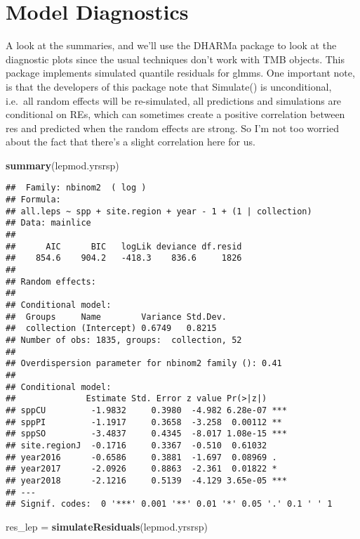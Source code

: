 \documentclass[]{article}
\newenvironment{Shaded}{\begin{snugshade}}{\end{snugshade}}
\newcommand{\KeywordTok}[1]{\textcolor[rgb]{0.13,0.29,0.53}{\textbf{#1}}}
\newcommand{\StringTok}[1]{\textcolor[rgb]{0.31,0.60,0.02}{#1}}
\newcommand{\NormalTok}[1]{#1}
\begin{document}
\section{Model Diagnostics}\label{model-diagnostics}

A look at the summaries, and we'll use the DHARMa package to look at the
diagnostic plots since the usual techniques don't work with TMB objects.
This package implements simulated quantile residuals for glmms. One
important note, is that the developers of this package note that
Simulate() is unconditional, i.e.~all random effects will be
re-simulated, all predictions and simulations are conditional on REs,
which can sometimes create a positive correlation between res and
predicted when the random effects are strong. So I'm not too worried
about the fact that there's a slight correlation here for us.

\begin{Shaded}
\begin{Highlighting}[]
\KeywordTok{summary}\NormalTok{(lepmod.yrsrsp)}
\end{Highlighting}
\end{Shaded}

\begin{verbatim}
##  Family: nbinom2  ( log )
## Formula:          
## all.leps ~ spp + site.region + year - 1 + (1 | collection)
## Data: mainlice
## 
##      AIC      BIC   logLik deviance df.resid 
##    854.6    904.2   -418.3    836.6     1826 
## 
## Random effects:
## 
## Conditional model:
##  Groups     Name        Variance Std.Dev.
##  collection (Intercept) 0.6749   0.8215  
## Number of obs: 1835, groups:  collection, 52
## 
## Overdispersion parameter for nbinom2 family (): 0.41 
## 
## Conditional model:
##              Estimate Std. Error z value Pr(>|z|)    
## sppCU         -1.9832     0.3980  -4.982 6.28e-07 ***
## sppPI         -1.1917     0.3658  -3.258  0.00112 ** 
## sppSO         -3.4837     0.4345  -8.017 1.08e-15 ***
## site.regionJ  -0.1716     0.3367  -0.510  0.61032    
## year2016      -0.6586     0.3881  -1.697  0.08969 .  
## year2017      -2.0926     0.8863  -2.361  0.01822 *  
## year2018      -2.1216     0.5139  -4.129 3.65e-05 ***
## ---
## Signif. codes:  0 '***' 0.001 '**' 0.01 '*' 0.05 '.' 0.1 ' ' 1
\end{verbatim}

\begin{Shaded}
\begin{Highlighting}[]
\NormalTok{res_lep =}\StringTok{ }\KeywordTok{simulateResiduals}\NormalTok{(lepmod.yrsrsp)}
\end{Highlighting}
\end{Shaded}
\end{document}
